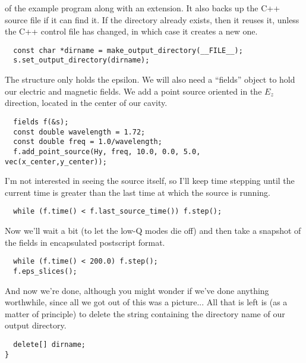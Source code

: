 of the example program along with an extension.  It also backs up the C++
source file if it can find it.  If the directory already exists, then it
reuses it, unless the C++ control file has changed, in which case it
creates a new one.
\begin{verbatim}
  const char *dirname = make_output_directory(__FILE__);
  s.set_output_directory(dirname);
\end{verbatim}
The structure only holds the epsilon.  We will also need a ``fields''
object to hold our electric and magnetic fields.  We add a point source
oriented in the $E_z$ direction, located in the center of our cavity.
\begin{verbatim}
  fields f(&s);
  const double wavelength = 1.72;
  const double freq = 1.0/wavelength;
  f.add_point_source(Hy, freq, 10.0, 0.0, 5.0, vec(x_center,y_center));
\end{verbatim}
I'm not interested in seeing the source itself, so I'll keep time stepping
until the current time is greater than the last time at which the source is
running.
\begin{verbatim}
  while (f.time() < f.last_source_time()) f.step();
\end{verbatim}
Now we'll wait a bit (to let the low-Q modes die off) and then take a
snapshot of the fields in encapsulated postscript format.
\begin{verbatim}
  while (f.time() < 200.0) f.step();
  f.eps_slices();
\end{verbatim}
And now we're done, although you might wonder if we've done anything
worthwhile, since all we got out of this was a picture... All that is left
is (as a matter of principle) to delete the string containing the directory
name of our output directory.
\begin{verbatim}
  delete[] dirname;
}
\end{verbatim}